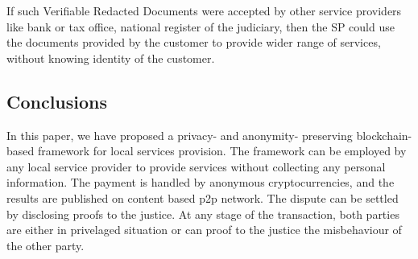 \documentclass{article}
\begin{document}
If such Verifiable Redacted Documents were accepted by other service providers like bank or tax office, national register of the judiciary, then the SP could use the documents provided by the customer to provide wider range of services, without knowing identity of the customer.%


\subsection{Conclusions}
In this paper, we have proposed a privacy- and anonymity- preserving blockchain-based framework for local services provision. The framework can be employed by any local service provider to provide services without collecting any personal information. The payment is handled by anonymous cryptocurrencies, and the results are published on content based p2p network. The dispute can be settled by disclosing proofs to the justice. At any stage of the transaction, both parties are either in privelaged situation or can proof to the justice the misbehaviour of the other party. 




\end{document}

